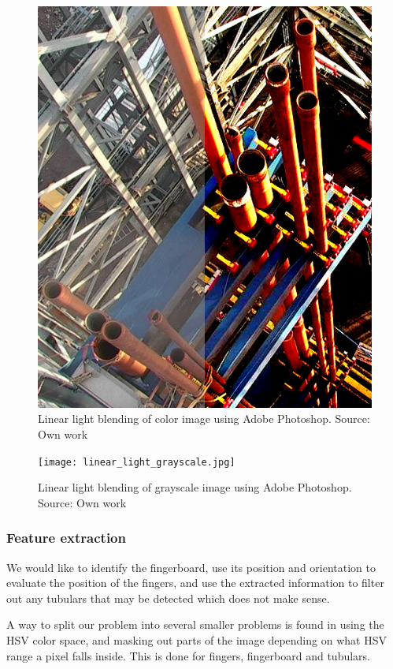 \begin{figure}[ht]
    \centering
    \includegraphics[width=1.0\textwidth]{linear_light.jpg}
    \caption{Linear light blending of color image using Adobe Photoshop. Source: Own work}
    \label{fig:linear_light}
\end{figure}
\FloatBarrier
\begin{figure}[ht]
    \centering
    \texttt{[image: linear\_light\_grayscale.jpg]}
    \caption{Linear light blending of grayscale image using Adobe Photoshop. Source: Own work}
    \label{fig:linear_light_grayscale}
\end{figure}
\FloatBarrier

\subsubsection{Feature extraction}
We would like to identify the fingerboard, use its position and orientation to evaluate the position of the fingers, and use the extracted information to filter out any tubulars that may be detected which does not make sense.

A way to split our problem into several smaller problems is found in using the HSV color space, and masking out parts of the image depending on what HSV range a pixel falls inside. This is done for fingers, fingerboard and tubulars.

